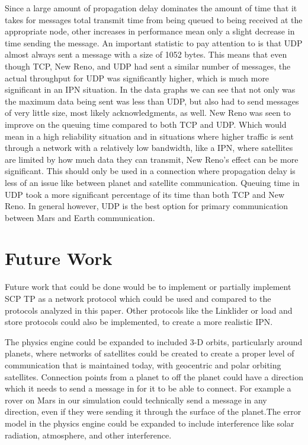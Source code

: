 \documentclass[a4paper,12pt]{article}
\begin{document}
Since a large amount of propagation delay dominates the amount of time that it
takes for messages total transmit time from being queued to being received at
the appropriate node, other increases in performance mean only a slight decrease
in time sending the message. An important statistic to pay attention to is that
UDP almost always sent a message with a size of 1052 bytes. This means that even
though TCP, New Reno, and UDP had sent a similar number of messages, the actual
throughput for UDP was significantly higher, which is much more significant in
an IPN situation. In the data graphs we can see that not only was the maximum
data being sent was less than UDP, but also had to send messages of very little
size, most likely acknowledgments, as well. New Reno was seen to improve on the
queuing time compared to both TCP and UDP. Which would mean in a high
reliability situation and in situations where higher traffic is sent through a
network with a relatively low bandwidth, like a IPN, where satellites are
limited by how much data they can transmit, New Reno's effect can be more
significant. This should only be used in a connection where propagation delay is
less of an issue like between planet and satellite communication. Queuing time
in UDP took a more significant percentage of its time than both TCP and New
Reno. In general however, UDP is the best option for primary communication
between Mars and Earth communication.

\section{Future Work}

Future work that could be done would be to implement or partially implement SCP
TP as a network protocol which could be used and compared to the protocols
analyzed in this paper. Other protocols like the Linklider or load and store
protocols could also be implemented, to create a more realistic IPN.

The physics engine could be expanded to included 3-D orbits, particularly around
planets, where networks of satellites could be created to create a proper level
of communication that is maintained today, with geocentric and polar orbiting
satellites. Connection points from a planet to off the planet could have a
direction which it needs to send a message in for it to be able to connect. For
example a rover on Mars in our simulation could technically send a message in
any direction, even if they were sending it through the surface of the
planet.The error model in the physics engine could be expanded to include
interference like solar radiation, atmosphere, and other interference.
\end{document}
